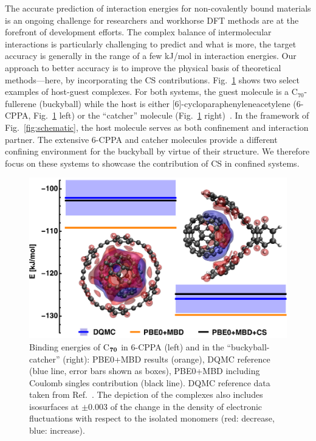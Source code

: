 \documentclass[aps,prl,groupaddress, twocolumn]{revtex4-1}  %
\begin{document}
The accurate prediction of interaction energies for non-covalently bound materials is an ongoing challenge for researchers and workhorse DFT methods are at the forefront of development efforts. The complex balance of intermolecular interactions is particularly challenging to predict and what is more, the target accuracy is generally in the range of a few kJ/mol in interaction energies. Our approach to better accuracy is to improve the physical basis of theoretical methods---here, by incorporating the CS contributions. 
Fig.~\ref{fig:flagshipsystems} shows two select examples of host-guest complexes. For both systems, the guest molecule is a C$_{70}$-fullerene (buckyball) while the host is either [6]-cycloparaphenyleneacetylene (6-CPPA, Fig.~\ref{fig:flagshipsystems} left) or the ``catcher'' molecule (Fig.~\ref{fig:flagshipsystems} right)~\cite{s12l_2013}. In the framework of Fig.~\ref{fig:schematic}, the host molecule serves as both confinement and interaction partner. The extensive 6-CPPA and catcher molecules provide a different confining environment for the buckyball by virtue of their structure. We therefore focus on these systems to showcase the contribution of CS in confined systems. 
\begin{figure}[htp!]
\centering
\includegraphics[scale=0.68]{Plots/S12L4b.eps}
\caption{Binding energies of C$_{\bf 70}$ in 6-CPPA (left) and in the ``buckyball-catcher'' (right):
PBE0+MBD results (orange), DQMC reference (blue line, error bars shown as boxes), PBE0+MBD including Coulomb singles contribution (black line).
DQMC reference data taken from Ref.~\cite{hermann_ncomm2017}.
The depiction of the complexes also includes isosurfaces at $\pm$0.003 of the change in the density of electronic fluctuations with respect to the isolated monomers (red: decrease, blue: increase).
}\label{fig:flagshipsystems}
\end{figure}
\end{document}
